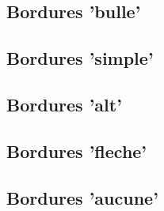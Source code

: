 \documentclass[a4paper,11pt]{article}
\begin{document}
\begin{demohigh}[language=latex/latex2]
\begin{BlocExo}[Bordures=normal]{}
\lipsum[1][1-3]
\end{BlocExo}
\end{demohigh}

\subsection{Bordures 'bulle'}

\begin{demohigh}[language=latex/latex2]
\begin{BlocExo}[Bordures=bulle]{}
\lipsum[1][1-3]
\end{BlocExo}
\end{demohigh}

\subsection{Bordures 'simple'}

\begin{demohigh}[language=latex/latex2]
\begin{BlocExo}[Bordures=simple]{}
\lipsum[1][1-3]
\end{BlocExo}
\end{demohigh}

\subsection{Bordures 'alt'}

\begin{demohigh}[language=latex/latex2]
\begin{BlocExo}[Bordures=alt]{}
\lipsum[1][1-3]
\end{BlocExo}
\end{demohigh}

\subsection{Bordures 'fleche'}

\begin{demohigh}[language=latex/latex2]
\begin{BlocExo}[Bordures=fleche]{}
\lipsum[1][1-3]
\end{BlocExo}
\end{demohigh}

\subsection{Bordures 'aucune'}
\end{document}
